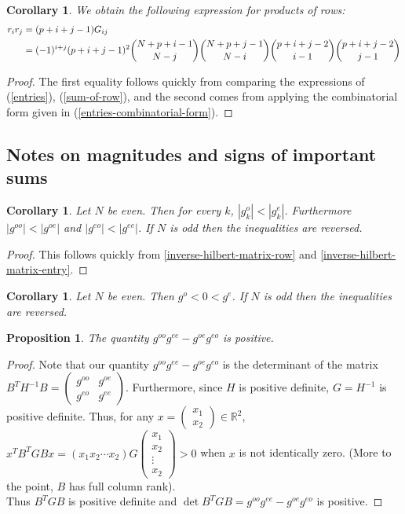 \documentclass{article}
\newtheorem{cor}[thm]{Corollary}
\newtheorem{prop}[thm]{Proposition}
\theoremstyle{definition}
\theoremstyle{remark}
\numberwithin{equation}{section}
\begin{document}
\begin{cor}\label{row-product} We obtain the following expression for products of rows:
\begin{align*}
r_ir_j &= (p+i+j-1) G_{ij} \\
&= (-1)^{i+j}(p+i+j-1)^2 \dbinom{N+p+i-1}{N-j} \dbinom{N+p+j-1}{N-i} \dbinom{p+i+j-2}{i-1} \dbinom{p+i+j-2}{j-1}
\end{align*}
\end{cor}

\begin{proof} The first equality follows quickly from comparing the expressions of (\ref{entries}), (\ref{sum-of-row}), and the second comes from applying the combinatorial form given in (\ref{entries-combinatorial-form}).
\end{proof}

\subsection{Notes on magnitudes and signs of important sums}
\begin{cor}
Let $N$ be even. Then for every $k$,  $|g_k^o| < |g_k^e|$. Furthermore $|g^{oo}| < |g^{oe}|$ and $|g^{eo}| < |g^{ee}|$.  If $N$ is odd then the inequalities are reversed. 
\end{cor}
\begin{proof}
This follows quickly from \ref{inverse-hilbert-matrix-row} and \ref{inverse-hilbert-matrix-entry}.
\end{proof}

\begin{cor}
Let $N$ be even. Then $g^o < 0 < g^e$. If $N$ is odd then the inequalities are reversed.
\end{cor}

\begin{prop}\label{inverse-determinant-is-positive}
The quantity $g^{oo}g^{ee} - g^{oe}g^{eo}$ is positive.
\end{prop}
\begin{proof}
Note that our quantity $g^{oo}g^{ee} - g^{oe}g^{eo}$ is the determinant of the matrix $B^TH^{-1}B = \begin{pmatrix} g^{oo} & g^{oe} \\ g^{eo} & g^{ee} \end{pmatrix}$. Furthermore, since $H$ is positive definite, $G=H^{-1}$ is positive definite. Thus, for any $x= \begin{pmatrix} x_1 \\ x_2 \end{pmatrix} \in \mathbb{R}^2$, $x^T B^TGBx = (x_1 x_2 \cdots x_2) G \begin{pmatrix} x_1 \\ x_2 \\ \vdots \\ x_2 \end{pmatrix} > 0$ when $x$ is not identically zero. (More to the point, $B$ has full column rank). \\
Thus $B^TGB$ is positive definite and $\det B^TGB = g^{oo}g^{ee} - g^{oe}g^{eo}$ is positive. 
\end{proof}
\end{document}
